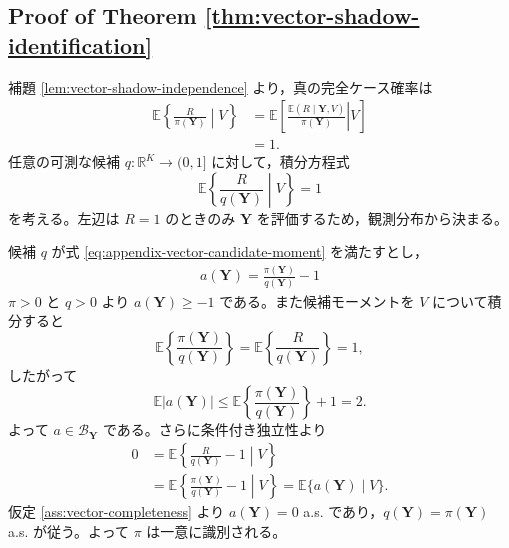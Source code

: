 \documentclass[10pt,a4paper]{article}
\newcommand{\E}{\mathbb{E}}
\newcommand{\R}{\mathbb{R}}
\newcommand{\1}{\mathbf{1}}
\newcommand{\Y}{\bm{Y}}
\begin{document}
\subsection{Proof of Theorem \ref{thm:vector-shadow-identification}}
補題 \ref{lem:vector-shadow-independence} より，真の完全ケース確率は
\begin{align}
  \E\left\{\frac{R}{\pi(\Y)}\middle|V\right\}
  &=\E\left[\left.
    \frac{\E(R\mid\Y,V)}{\pi(\Y)}\right|V\right]\\
  &=1.
  \label{eq:appendix-vector-ipw-moment}
\end{align}
任意の可測な候補 $q:\R^K\to(0,1]$ に対して，積分方程式
\begin{equation}
  \E\left\{\frac{R}{q(\Y)}\middle|V\right\}=1
  \label{eq:appendix-vector-candidate-moment}
\end{equation}
を考える。左辺は $R=1$ のときのみ $\Y$ を評価するため，観測分布から決まる。

候補 $q$ が式 \eqref{eq:appendix-vector-candidate-moment} を満たすとし，
\begin{align}
  a(\Y)=\frac{\pi(\Y)}{q(\Y)}-1
  \label{eq:appendix-vector-ratio-function}
\end{align}
$\pi>0$ と $q>0$ より $a(\Y)\geq-1$ である。また候補モーメントを $V$ について積分すると
\begin{equation}
  \E\left\{\frac{\pi(\Y)}{q(\Y)}\right\}
  =\E\left\{\frac{R}{q(\Y)}\right\}=1,
\end{equation}
したがって
\begin{equation}
  \E|a(\Y)|
  \leq \E\left\{\frac{\pi(\Y)}{q(\Y)}\right\}+1=2.
  \label{eq:appendix-vector-ratio-integrability}
\end{equation}
よって $a\in\mathcal B_{\Y}$ である。さらに条件付き独立性より
\begin{align}
0
&=\E\left\{\frac{R}{q(\Y)}-1\middle|V\right\}\\
&=\E\left\{\frac{\pi(\Y)}{q(\Y)}-1\middle|V\right\}
=\E\{a(\Y)\mid V\}.
\end{align}
仮定 \ref{ass:vector-completeness} より $a(\Y)=0$ a.s. であり，$q(\Y)=\pi(\Y)$ a.s. が従う。よって $\pi$ は一意に識別される。
\end{document}
